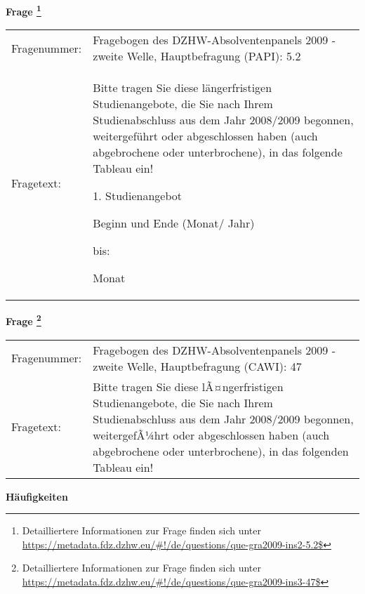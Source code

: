 				\vspace*{0.5cm}
                \noindent\textbf{Frage
	                \footnote{Detailliertere Informationen zur Frage finden sich unter
		              \url{https://metadata.fdz.dzhw.eu/\#!/de/questions/que-gra2009-ins2-5.2$}}}\\
				\begin{tabularx}{\hsize}{@{}lX}
					Fragenummer: &
					  Fragebogen des DZHW-Absolventenpanels 2009 - zweite Welle, Hauptbefragung (PAPI):
					  5.2
 \\
					Fragetext: & Bitte tragen Sie diese längerfristigen Studienangebote, die Sie nach Ihrem Studienabschluss aus dem Jahr 2008/2009 begonnen, weitergeführt oder abgeschlossen haben (auch abgebrochene oder unterbrochene), in das folgende Tableau ein!\par  1. Studienangebot\par  Beginn und Ende (Monat/ Jahr)\par  bis:\par  Monat \\
				\end{tabularx}
				\vspace*{0.5cm}
                \noindent\textbf{Frage
	                \footnote{Detailliertere Informationen zur Frage finden sich unter
		              \url{https://metadata.fdz.dzhw.eu/\#!/de/questions/que-gra2009-ins3-47$}}}\\
				\begin{tabularx}{\hsize}{@{}lX}
					Fragenummer: &
					  Fragebogen des DZHW-Absolventenpanels 2009 - zweite Welle, Hauptbefragung (CAWI):
					  47
 \\
					Fragetext: & Bitte tragen Sie diese lÃ¤ngerfristigen Studienangebote, die Sie nach Ihrem Studienabschluss aus dem Jahr 2008/2009 begonnen, weitergefÃ¼hrt oder abgeschlossen haben (auch abgebrochene oder unterbrochene), in das folgenden Tableau ein! \\
				\end{tabularx}





        		\vspace*{0.5cm}
                \noindent\textbf{Häufigkeiten}

